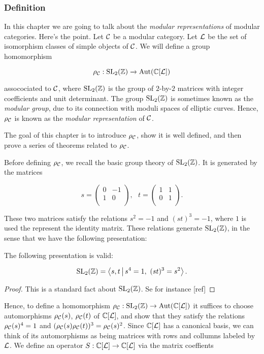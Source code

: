 \subsubsection{Definition}

In this chapter we are going to talk about the {\em modular representations} of modular categories. Here's the point. Let ${\mathcal C}$ be a modular category. Let ${\mathcal L}$ be the set of isomorphism classes of simple objects of ${\mathcal C}$. We will define a group homomorphism

$$\rho_{{\mathcal C}}:\operatorname{SL}_2({\mathbb Z})\xrightarrow{}\operatorname{Aut}({\mathbb C}[{\mathcal L}])$$

assocociated to ${\mathcal C}$, where $\operatorname{SL}_2({\mathbb Z})$ is the group of $2$-by-$2$ matrices with integer coefficients and unit determinant. The group $\operatorname{SL}_2({\mathbb Z})$ is sometimes known as the {\em modular group}, due to its connection with moduli spaces of elliptic curves. Hence, $\rho_{{\mathcal C}}$ is known as the {\em modular representation} of ${\mathcal C}$.

The goal of this chapter is to introduce $\rho_{{\mathcal C}}$, show it is well defined, and then prove a series of theorems related to $\rho_{{\mathcal C}}$.

Before defining $\rho_{{\mathcal C}}$, we recall the basic group theory of $\operatorname{SL}_2({\mathbb Z})$. It is generated by the matrices

$$
s=
\begin{pmatrix}
0 & -1 \\
1 & 0 \\
\end{pmatrix},
\,\,\,\,
t=
\begin{pmatrix}
1 & 1 \\
0 & 1 \\
\end{pmatrix}.
$$

These two matrices satisfy the relations $s^2=-1$ and $(st)^3=-1$, where $1$ is used the represent the identity matrix. These relations generate $\operatorname{SL}_2({\mathbb Z})$, in the sense that we have the following presentation:

\begin{prop} The following presentation is valid:

$$\operatorname{SL}_2({\mathbb Z})=\Braket{s,t | s^4=1,\,\, (st)^3=s^2}.$$
\end{prop}
\begin{proof} This is a standard fact about $\operatorname{SL}_2({\mathbb Z})$. Se for instance [ref]
\end{proof}

Hence, to define a homomorphism $\rho_{{\mathcal C}}:\operatorname{SL}_2({\mathbb Z})\to \operatorname{Aut}({\mathbb C}[{\mathcal L}])$ it suffices to choose automorphisms $\rho_{{\mathcal C}}(s)$, $\rho_{{\mathcal C}}(t)$ of ${\mathbb C}[{\mathcal L}]$, and show that they satisfy the relations $\rho_{{\mathcal C}}(s)^4=1$ and $(\rho_{{\mathcal C}}(s)\rho_{{\mathcal C}}(t))^3=\rho_{{\mathcal C}}(s)^2$. Since ${\mathbb C}[{\mathcal L}]$ has a canonical basis, we can think of its automorphisms as being matrices with rows and collumns labeled by ${\mathcal L}$. We define an operator $S:{\mathbb C}[{\mathcal L}]\to {\mathbb C}[{\mathcal L}]$ via the matrix coeffients

